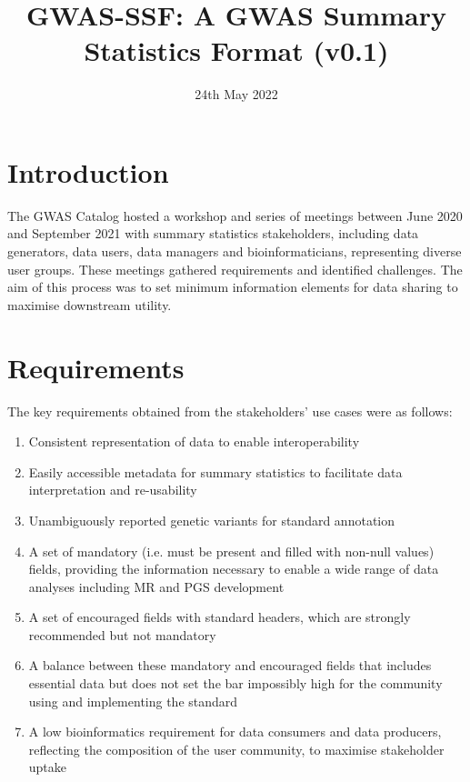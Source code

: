 \documentclass[11pt]{article}
\title{GWAS-SSF: A GWAS Summary Statistics Format (v0.1)}
\date{24th May 2022}
\begin{document}
\maketitle

\newpage
\tableofcontents

\newpage

\section{Introduction}
The GWAS Catalog hosted a workshop and series of meetings between June 2020 and September 2021 with summary statistics stakeholders, including data generators, data users, data managers and bioinformaticians, representing diverse user groups. These meetings gathered requirements and identified challenges. The aim of this process was to set minimum information elements for data sharing to maximise downstream utility.

\section{Requirements}

The key requirements obtained from the stakeholders’ use cases were as follows:

\begin{enumerate}
\item Consistent representation of data to enable interoperability
\item Easily accessible metadata for summary statistics to facilitate data interpretation and re-usability
\item Unambiguously reported genetic variants for standard annotation
\item A set of mandatory (i.e. must be present and filled with non-null values) fields, providing the information necessary to enable a wide range of data analyses including MR and PGS development
\item A set of encouraged fields with standard headers, which are strongly recommended but not mandatory 
\item A balance between these mandatory and encouraged fields that includes essential data but does not set the bar impossibly high for the community using and implementing the standard
\item A low bioinformatics requirement for data consumers and data producers, reflecting the composition of the user community, to maximise stakeholder uptake 
\end{enumerate}
\end{document}
